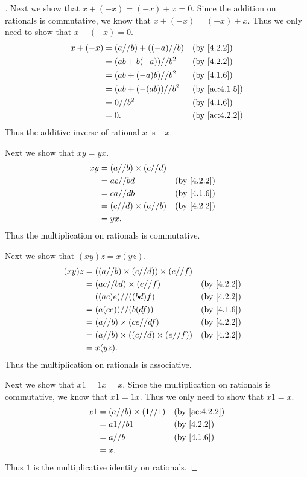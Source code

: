 \begin{proof}[]
  Next we show that \(x + (-x) = (-x) + x = 0\).
  Since the addition on rationals is commutative, we know that \(x + (-x) = (-x) + x\).
  Thus we only need to show that \(x + (-x) = 0\).
  \begin{align*}
    x + (-x) & = (a // b) + ((-a) // b) &  & \by{4.2.2}    \\
             & = (ab + b(-a)) // b^2    &  & \by{4.2.2}    \\
             & = (ab + (-a)b) // b^2    &  & \by{4.1.6}    \\
             & = (ab + (-(ab)) // b^2   &  & \by{ac:4.1.5} \\
             & = 0 // b^2               &  & \by{4.1.6}    \\
             & = 0.                     &  & \by{ac:4.2.2}
  \end{align*}
  Thus the additive inverse of rational \(x\) is \(-x\).

  Next we show that \(xy = yx\).
  \begin{align*}
    xy & = (a // b) \times (c // d)                 \\
       & = ac // bd                 &  & \by{4.2.2} \\
       & = ca // db                 &  & \by{4.1.6} \\
       & = (c // d) \times (a // b) &  & \by{4.2.2} \\
       & = yx.
  \end{align*}
  Thus the multiplication on rationals is commutative.

  Next we show that \((xy)z = x(yz)\).
  \begin{align*}
    (xy)z & = ((a // b) \times (c // d)) \times (e // f)                 \\
          & = (ac // bd) \times (e // f)                 &  & \by{4.2.2} \\
          & = ((ac)e) // ((bd)f)                         &  & \by{4.2.2} \\
          & = (a(ce)) // (b(df))                         &  & \by{4.1.6} \\
          & = (a // b) \times (ce // df)                 &  & \by{4.2.2} \\
          & = (a // b) \times ((c // d) \times (e // f)) &  & \by{4.2.2} \\
          & = x(yz).
  \end{align*}
  Thus the multiplication on rationals is associative.

  Next we show that \(x1 = 1x = x\).
  Since the multiplication on rationals is commutative, we know that \(x1 = 1x\).
  Thus we only need to show that \(x1 = x\).
  \begin{align*}
    x1 & = (a // b) \times (1 // 1) &  & \by{ac:4.2.2} \\
       & = a1 // b1                 &  & \by{4.2.2}    \\
       & = a // b                   &  & \by{4.1.6}    \\
       & = x.
  \end{align*}
  Thus \(1\) is the multiplicative identity on rationals.


\end{proof}
